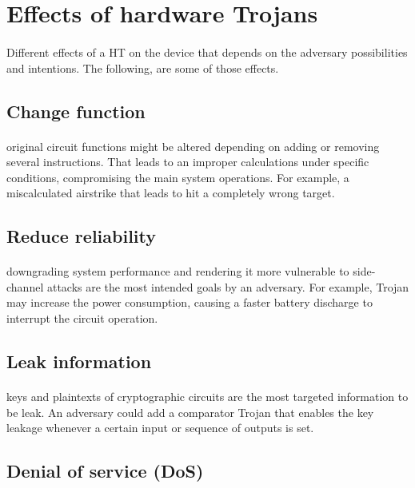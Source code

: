 \section{Effects of hardware Trojans}
\paragraph*{}
Different effects of a HT on the device that depends on the adversary possibilities and intentions. The following, are some of those effects.

\subsection{Change function}
\paragraph*{}
original circuit functions might be altered depending on adding or removing several instructions. That leads to an improper calculations under specific conditions, compromising the main system operations. For example, a miscalculated airstrike that leads to hit a completely wrong target.
\subsection{Reduce reliability}
\paragraph*{}
downgrading system performance and rendering it more vulnerable to side-channel attacks are the most intended goals by an adversary. For example, Trojan may increase the power consumption, causing a faster battery discharge to interrupt the circuit operation.
\subsection{Leak information}
\paragraph*{}
keys and plaintexts of cryptographic circuits are the most targeted information to be leak. An adversary could add a comparator Trojan that enables the key leakage whenever a certain input or sequence of outputs is set.
\subsection{Denial of service (DoS)}
